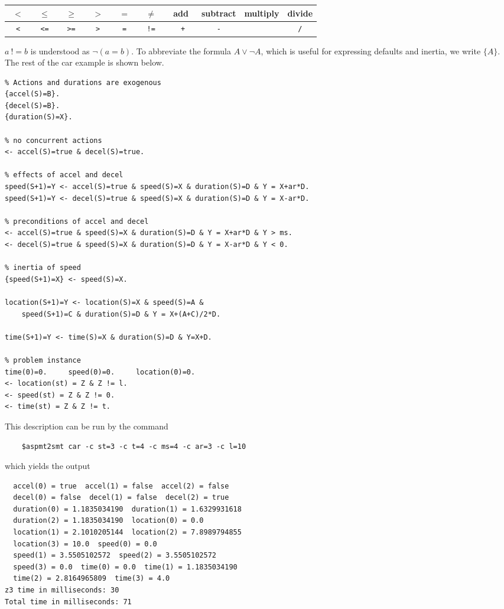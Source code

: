 \documentclass[runningheads]{llncs}
\begin{document}
\begin{center}
\begin{tabular}{|c|c|c|c|c|c|c|c|c|c|} \hline
$~~<~~$ & $~~\leq~~$ & $~~\geq~~$ & $~~>~~$ & $~~=~~$ & $~~\neq~~$ & ~add~ & subtract & multiply & divide \\
\hline
{\tt <} & {\tt <=} & {\tt >=} & {\tt >} & {\tt =} & {\tt !\!=} & {\tt
  +} & {\tt -} & {\tt *} & {\tt /} \\ \hline
\end{tabular}
\end{center}

$a\  !\!= b$ is understood as $\neg (a = b)$. To abbreviate the
formula $A \lor \neg A$, which is useful for expressing defaults and
inertia, we write $\{A\}$. The rest of the car example is shown below.

\begin{lstlisting}
% Actions and durations are exogenous
{accel(S)=B}.
{decel(S)=B}.
{duration(S)=X}.

% no concurrent actions 
<- accel(S)=true & decel(S)=true.

% effects of accel and decel
speed(S+1)=Y <- accel(S)=true & speed(S)=X & duration(S)=D & Y = X+ar*D. 
speed(S+1)=Y <- decel(S)=true & speed(S)=X & duration(S)=D & Y = X-ar*D. 

% preconditions of accel and decel
<- accel(S)=true & speed(S)=X & duration(S)=D & Y = X+ar*D & Y > ms. 
<- decel(S)=true & speed(S)=X & duration(S)=D & Y = X-ar*D & Y < 0. 

% inertia of speed
{speed(S+1)=X} <- speed(S)=X.

location(S+1)=Y <- location(S)=X & speed(S)=A & 
    speed(S+1)=C & duration(S)=D & Y = X+(A+C)/2*D.

time(S+1)=Y <- time(S)=X & duration(S)=D & Y=X+D.

% problem instance
time(0)=0.     speed(0)=0.     location(0)=0.
<- location(st) = Z & Z != l.
<- speed(st) = Z & Z != 0.
<- time(st) = Z & Z != t.
\end{lstlisting}

This description can be run by the command 
\begin{lstlisting}
    $aspmt2smt car -c st=3 -c t=4 -c ms=4 -c ar=3 -c l=10
\end{lstlisting}
%
which yields the output
%
\begin{lstlisting}
  accel(0) = true  accel(1) = false  accel(2) = false
  decel(0) = false  decel(1) = false  decel(2) = true
  duration(0) = 1.1835034190  duration(1) = 1.6329931618
  duration(2) = 1.1835034190  location(0) = 0.0
  location(1) = 2.1010205144  location(2) = 7.8989794855
  location(3) = 10.0  speed(0) = 0.0
  speed(1) = 3.5505102572  speed(2) = 3.5505102572
  speed(3) = 0.0  time(0) = 0.0  time(1) = 1.1835034190
  time(2) = 2.8164965809  time(3) = 4.0
z3 time in milliseconds: 30
Total time in milliseconds: 71
\end{lstlisting}
\end{document}
